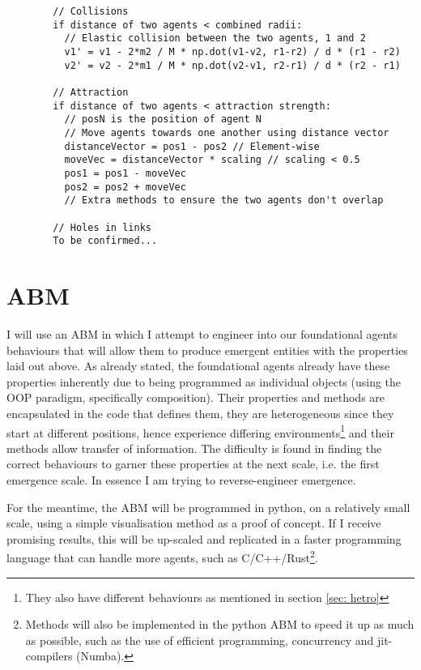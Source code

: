 \documentclass{article}
\begin{document}
      \begin{verbatim}
        // Collisions
        if distance of two agents < combined radii:
          // Elastic collision between the two agents, 1 and 2
          v1' = v1 - 2*m2 / M * np.dot(v1-v2, r1-r2) / d * (r1 - r2) 
          v2' = v2 - 2*m1 / M * np.dot(v2-v1, r2-r1) / d * (r2 - r1)

        // Attraction
        if distance of two agents < attraction strength:
          // posN is the position of agent N
          // Move agents towards one another using distance vector 
          distanceVector = pos1 - pos2 // Element-wise 
          moveVec = distanceVector * scaling // scaling < 0.5
          pos1 = pos1 - moveVec
          pos2 = pos2 + moveVec
          // Extra methods to ensure the two agents don't overlap

        // Holes in links
        To be confirmed...
      \end{verbatim}


\section{ABM}

  I will use an ABM in which I attempt to engineer into our foundational agents behaviours that will allow them to produce emergent entities with the properties laid out above. As already stated, the foundational agents already have these properties inherently due to being programmed as individual objects (using the OOP paradigm, specifically composition). Their properties and methods are encapsulated in the code that defines them, they are heterogeneous since they start at different positions, hence experience differing environments\footnote{They also have different behaviours as mentioned in section \ref{sec: hetro}} and their methods allow transfer of information. The difficulty is found in finding the correct behaviours to garner these properties at the next scale, i.e. the first emergence scale. In essence I am trying to reverse-engineer emergence.

    For the meantime, the ABM will be programmed in python, on a relatively small scale, using a simple visualisation method as a proof of concept. If I receive promising results, this will be up-scaled and replicated in a faster programming language that can handle more agents, such as C/C++/Rust\footnote{Methods will also be implemented in the python ABM to speed it up as much as possible, such as the use of efficient programming, concurrency and jit-compilers (Numba).}. 
\end{document}
